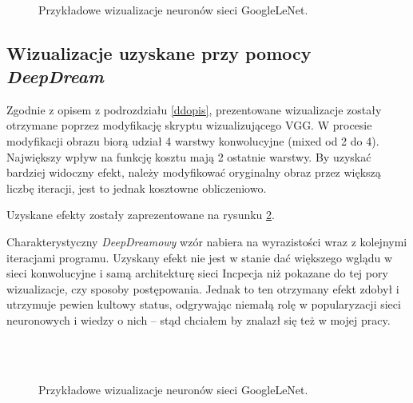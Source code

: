 \begin{figure}
~
\caption{Przykładowe wizualizacje neuronów sieci GoogleLeNet.}
\label{fig:incOtherVis}
\end{figure}

\subsection{Wizualizacje uzyskane przy pomocy \textit{DeepDream}}
Zgodnie z opisem z podrozdziału \ref{ddopis}, prezentowane wizualizacje zostały otrzymane poprzez modyfikację skryptu wizualizującego VGG. W procesie modyfikacji obrazu biorą udział 4 warstwy konwolucyjne (mixed od 2 do 4). Największy wpływ na funkcję kosztu mają 2 ostatnie warstwy. By uzyskać bardziej widoczny efekt, należy modyfikować oryginalny obraz przez większą liczbę iteracji, jest to jednak kosztowne obliczeniowo.

Uzyskane efekty zostały zaprezentowane na rysunku \ref{fig:deepdream}.

Charakterystyczny \textit{DeepDreamowy} wzór nabiera na wyrazistości wraz z kolejnymi iteracjami programu. Uzyskany efekt nie jest w stanie dać większego wglądu w sieci konwolucyjne i samą architekturę sieci Incpecja niż pokazane do tej pory wizualizacje, czy sposoby postępowania. Jednak to ten otrzymany efekt zdobył i utrzymuje pewien kultowy status, odgrywając niemałą rolę w popularyzacji sieci neuronowych i wiedzy o nich -- stąd chciałem by znalazł się też w mojej pracy.

\begin{figure}
~
\\
~
\caption{Przykładowe wizualizacje neuronów sieci GoogleLeNet.}
\label{fig:deepdream}
\end{figure}

